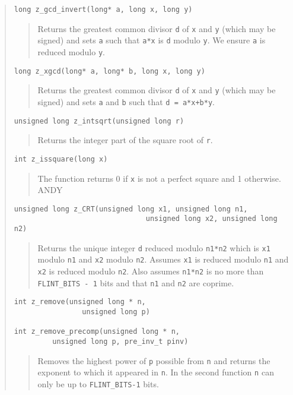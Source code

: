 \documentclass[a4paper,10pt]{article}
\newcommand{\code}{\lstinline}
\begin{document}
\begin{quote}
\begin{lstlisting}
long z_gcd_invert(long* a, long x, long y)
\end{lstlisting}
\begin{quote}
Returns the greatest common divisor \code{d} of \code{x} and \code{y} (which may be signed) and sets \code{a} such that \code{a*x} is \code{d} modulo \code{y}. We ensure \code{a} is reduced modulo \code{y}.
\end{quote}

\begin{lstlisting}
long z_xgcd(long* a, long* b, long x, long y)
\end{lstlisting}
\begin{quote}
Returns the greatest common divisor \code{d} of \code{x} and \code{y} (which may be signed) and sets \code{a} and \code{b} such that \code{d = a*x+b*y}. 
\end{quote}

\begin{lstlisting}
unsigned long z_intsqrt(unsigned long r)
\end{lstlisting}
\begin{quote}
Returns the integer part of the square root of \code{r}. 
\end{quote}

\begin{lstlisting}
int z_issquare(long x)
\end{lstlisting}
\begin{quote}
The function returns 0 if \code{x} is not a perfect square and 1 otherwise.  ANDY
\end{quote}

\begin{lstlisting}
unsigned long z_CRT(unsigned long x1, unsigned long n1, 
                               unsigned long x2, unsigned long n2)
\end{lstlisting}
\begin{quote}
Returns the unique integer \code{d} reduced modulo \code{n1*n2} which is \code{x1} modulo \code{n1} and \code{x2} modulo \code{n2}. Assumes \code{x1} is reduced modulo \code{n1} and \code{x2} is reduced modulo \code{n2}. Also assumes \code{n1*n2} is no more than \code{FLINT_BITS - 1} bits and that \code{n1} and \code{n2} are coprime.
\end{quote}

\begin{lstlisting}
int z_remove(unsigned long * n, 
                unsigned long p)

int z_remove_precomp(unsigned long * n, 
         unsigned long p, pre_inv_t pinv)
\end{lstlisting}
\begin{quote}
Removes the highest power of \code{p} possible from \code{n} and returns the exponent to which it appeared in \code{n}.  In the second function \code{n} can only be up to \code{FLINT_BITS-1} bits.
\end{quote}


\end{quote}
\end{document}
